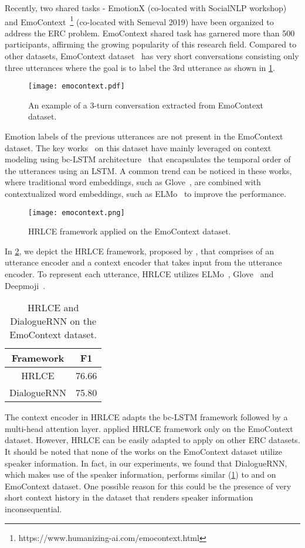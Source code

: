 \documentclass{IEEEtran}\usepackage[pdftex]{graphicx}
\begin{document}
	Recently, two shared tasks - EmotionX (co-located with SocialNLP workshop) and EmoContext~\footnote{https://www.humanizing-ai.com/emocontext.html} (co-located with Semeval 2019) have been organized to address the ERC problem. EmoContext shared task has garnered more than 500 participants, affirming the growing popularity of this research field. Compared to other datasets, EmoContext dataset~\citep{chatterjee2019understanding} has very short conversations consisting only three utterances where the goal is to label the 3rd utterance as shown in \cref{fig:emocontext2}.
	\begin{figure}[h]
		\centering
		\texttt{[image: emocontext.pdf]}
		\caption{An example of a 3-turn conversation extracted from EmoContext dataset.}
		\label{fig:emocontext2}
	\end{figure}
	Emotion labels of the previous utterances are not present in the EmoContext dataset. The key works~\citep{bae2019snu_ids, huang2019ana, chatterjee2019understanding} on this dataset have mainly leveraged on context modeling using bc-LSTM architecture~\citep{poria2017context} that encapsulates the temporal order of the utterances using an LSTM. A common trend can be noticed in these works, where traditional word embeddings, such as Glove~\citep{pennington2014glove}, are combined with contextualized word embeddings, such as ELMo~\citep{peters2018deep} to improve the performance.
	\begin{figure}[!h]
		\centering
		\texttt{[image: emocontext.png]}
		\caption{HRLCE framework applied on the EmoContext dataset.}
		\label{fig:emocontext}
	\end{figure}
	In \cref{fig:emocontext}, we depict the HRLCE framework, proposed by \citet{huang2019ana}, that comprises of an utterance encoder and a context encoder that takes input from the utterance encoder. To represent each utterance, HRLCE utilizes ELMo~\citep{peters2018deep}, Glove~\citep{pennington2014glove} and Deepmoji~\citep{felbo2017using}. \begin{table}[!h]
		\centering
\begin{tabular}{|c|c|}
			\hline
			Framework & F1 \\
			\hline
			HRLCE&76.66\\
			DialogueRNN&75.80\\
			\hline
		\end{tabular}
		\caption{HRLCE and DialogueRNN on the EmoContext dataset.}
		\label{tab:emocontextexp}
	\end{table}
	The context encoder in HRLCE adapts the bc-LSTM framework followed by a multi-head attention layer. \citet{huang2019ana} applied HRLCE framework only on the EmoContext dataset. However, HRLCE can be easily adapted to apply on other ERC datasets. It should be noted that none of the works on the EmoContext dataset utilize speaker information. In fact, in our experiments, we found that DialogueRNN, which makes use of the speaker information, performs similar (\cref{tab:emocontextexp}) to \citet{bae2019snu_ids, huang2019ana} and \citet{chatterjee2019understanding} on EmoContext dataset. One possible reason for this could be the presence of very short context history in the dataset that renders speaker information inconsequential.
	
\end{document}
